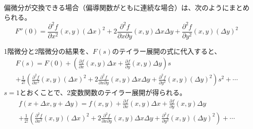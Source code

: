 \documentclass[../../../topic_calculus]{subfiles}
\begin{document}
偏微分が交換できる場合（偏導関数がともに連続な場合）は、次のようにまとめられる。
\begin{equation*}
  F''(0) = \frac{\partial^2 f}{\partial x^2}(x, y)(\Delta x)^2 + 2\frac{\partial^2 f}{\partial x \partial y}(x, y)\Delta x \Delta y + \frac{\partial^2 f}{\partial y^2}(x, y)(\Delta y)^2
\end{equation*}

\br

1階微分と2階微分の結果を、$F(s)$のテイラー展開の式に代入すると、
\begin{multline*}
  F(s) = F(0) + \left(\frac{\partial f}{\partial x}(x, y)\Delta x + \frac{\partial f}{\partial y}(x, y)\Delta y\right)s \\ + \frac{1}{2!}\left(\frac{\partial^2 f}{\partial x^2}(x, y)(\Delta x)^2 + 2\frac{\partial^2 f}{\partial x \partial y}(x, y)\Delta x \Delta y + \frac{\partial^2 f}{\partial y^2}(x, y)(\Delta y)^2\right)s^2 + \cdots
\end{multline*}
$s = 1$とおくことで、2変数関数のテイラー展開が得られる。
\begin{multline*}
  f(x + \Delta x, y + \Delta y) = f(x, y) + \frac{\partial f}{\partial x}(x, y)\Delta x + \frac{\partial f}{\partial y}(x, y)\Delta y \\ + \frac{1}{2!}\left(\frac{\partial^2 f}{\partial x^2}(x, y)(\Delta x)^2 + 2\frac{\partial^2 f}{\partial x \partial y}(x, y)\Delta x \Delta y + \frac{\partial^2 f}{\partial y^2}(x, y)(\Delta y)^2\right) + \cdots
\end{multline*}
\end{document}
